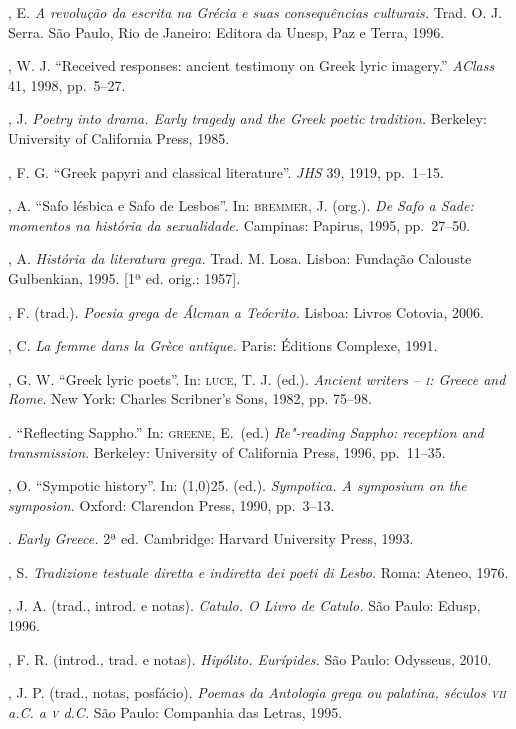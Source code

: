 \begin{bibliohedra}
, E. \textit{A revolução da escrita na Grécia e suas
consequências culturais.} Trad. O. J. Serra. São Paulo, Rio de Janeiro: Editora
da Unesp, Paz e Terra, 1996.

, W. J. ``Received responses: ancient testimony on Greek lyric imagery.'' 
\textit{AClass} 41, 1998, pp.~5--27. 

, J. \textit{Poetry into drama. Early tragedy and the Greek
poetic tradition.} Berkeley: University of California Press, 1985.

, F. G. “Greek papyri and classical literature”.
\textit{JHS} 39, 1919, pp.~1--15.

, A. “Safo lésbica e Safo de Lesbos”. In: \textsc{bremmer}, J.
(org.). \textit{De Safo a Sade: momentos na história da sexualidade.} Campinas:
Papirus, 1995, pp.~27--50.

, A. \textit{História da literatura grega.} Trad. M. Losa. Lisboa:
Fundação Calouste Gulbenkian, 1995. [1ª ed. orig.: 1957].

, F. (trad.). \textit{Poesia grega de Álcman a Teócrito.}
Lisboa: Livros Cotovia, 2006.

, C. \textit{La femme dans la Grèce antique.} Paris: Éditions
Complexe, 1991.

, G. W. “Greek lyric poets”. In: \textsc{luce}, T. J. (ed.). \textit{Ancient writers -- \textsc{i}: Greece and Rome}. New York: Charles Scribner's Sons, 1982, pp. 75--98. 

\titidem. ``Reflecting Sappho.'' In: \textsc{greene}, E.~(ed.) 
\textit{Re"-reading Sappho: reception and transmission}. Berkeley: University of California Press,
1996, pp.~11--35.

, O. “Sympotic history”. In: \line(1,0){25}. (ed.).
\textit{Sympotica. A symposium on the symposion.} Oxford: Clarendon Press,
1990, pp.~3--13.

\titidem. \textit{Early Greece.} 2ª ed.
Cambridge: Harvard University Press, 1993.

, S. \textit{Tradizione testuale diretta e indiretta dei poeti
di Lesbo.} Roma: Ateneo, 1976. 

, J. A. (trad., introd. e notas). \textit{Catulo. O Livro de
Catulo.} São Paulo: Edusp, 1996.

, F. R. (introd., trad. e notas). \textit{Hipólito. Eurípides.}
São Paulo: Odysseus, 2010.

, J. P. (trad., notas, posfácio). \textit{Poemas da Antologia grega
ou palatina, séculos \textsc{vii} a.C. a \textsc{v} d.C.} São Paulo: Companhia das Letras, 1995.


\end{bibliohedra}
